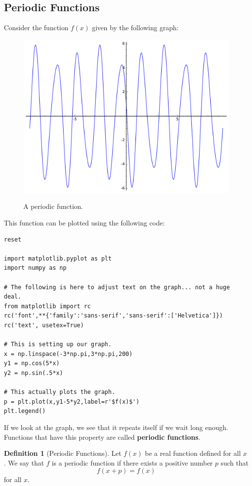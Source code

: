 \documentclass[10pt,]{book}
\newcommand{\terminology}[1]{\textbf{#1}}
\theoremstyle{plain}
\theoremstyle{definition}
\newtheorem{definition}[theorem]{Definition}
\theoremstyle{definition}
\numberwithin{equation}{section}
\begin{document}
\subsection[{Periodic Functions}]{Periodic Functions}\label{subsection-periodic-functions}
Consider the function \(f(x)\) given by the following graph:%
\leavevmode%
\begin{figure}
\centering
{}%
{\includegraphics[width=1\linewidth]{images/image-sageplot-periodic-function.pdf}}%
\caption{A periodic function.\label{figure-sageplot-periodic-function}}
\end{figure}
\par
This function can be plotted using the following code:%
\begin{lstlisting}[style=sageinput]
reset

import matplotlib.pyplot as plt
import numpy as np

# The following is here to adjust text on the graph... not a huge deal.
from matplotlib import rc
rc('font',**{'family':'sans-serif','sans-serif':['Helvetica']})
rc('text', usetex=True)

# This is setting up our graph.
x = np.linspace(-3*np.pi,3*np.pi,200)
y1 = np.cos(5*x)
y2 = np.sin(.5*x)

# This actually plots the graph.
p = plt.plot(x,y1-5*y2,label=r'$f(x)$')
plt.legend()
\end{lstlisting}
\par
If we look at the graph, we see that it repeats itself if we wait long enough. Functions that have this property are called \terminology{periodic functions}.%
\begin{definition}[{Periodic Functions}]\label{definition-periodic-functions}
Let \(f(x)\) be a real function defined for all \(x\). We say that \(f\) is a periodic function if there exists a positive number \(p\) such that
                    \begin{equation*}
                        f(x+p) = f(x)
                    \end{equation*}
                    for all \(x\).%
\end{definition}
\end{document}
